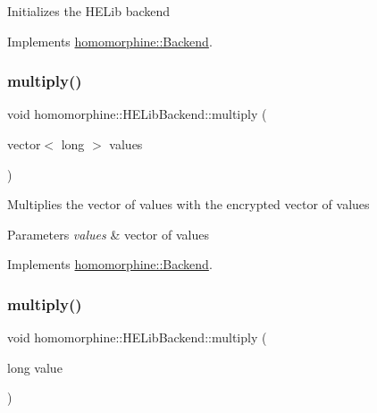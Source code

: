 Initializes the H\+E\+Lib backend 

Implements \mbox{\hyperlink{classhomomorphine_1_1_backend_a8ac9e6b5d747ecd4db48d1bf1c1b7a8c}{homomorphine\+::\+Backend}}.

\mbox{\label{classhomomorphine_1_1_h_e_lib_backend_a05b508bcc4a165d045ebc09f190c5a95}} 
\subsubsection{\texorpdfstring{multiply()}{multiply()}\hspace{0.1cm}{\footnotesize\ttfamily [1/2]}}
{\footnotesize\ttfamily void homomorphine\+::\+H\+E\+Lib\+Backend\+::multiply (\begin{DoxyParamCaption}\item[{vector$<$ long $>$}]{values }\end{DoxyParamCaption})\hspace{0.3cm}{\ttfamily [virtual]}}

Multiplies the vector of values with the encrypted vector of values


\begin{DoxyParams}{Parameters}
{\em values} & vector of values \\
\hline
\end{DoxyParams}


Implements \mbox{\hyperlink{classhomomorphine_1_1_backend_a716a0d366daf9a6491ba4d33ebb57d41}{homomorphine\+::\+Backend}}.

\mbox{\label{classhomomorphine_1_1_h_e_lib_backend_a49d4e073eecc4759f12f60188a533835}} 
\subsubsection{\texorpdfstring{multiply()}{multiply()}\hspace{0.1cm}{\footnotesize\ttfamily [2/2]}}
{\footnotesize\ttfamily void homomorphine\+::\+H\+E\+Lib\+Backend\+::multiply (\begin{DoxyParamCaption}\item[{long}]{value }\end{DoxyParamCaption})\hspace{0.3cm}{\ttfamily [virtual]}}

